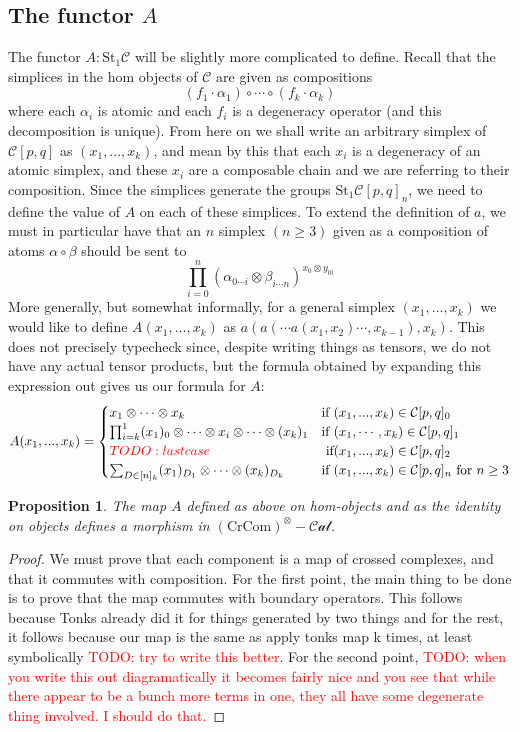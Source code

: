 \documentclass[12pt]{article}
\newtheorem{proposition}[theorem]{Proposition}
\theoremstyle{definition}
\newcommand{\TODO}[1]{\textcolor{red}{TODO: {#1}}}
\newcommand{\C}{\mathcal{C}}
\newcommand{\crcom}{\text{CrCom}}
\newcommand{\tensorcrossedcat}{(\crcom)^\otimes-\mathcal{Cat}}
\begin{document}
\subsection{The functor $A$}  
	The functor $A: \text{St}_1 \C$ will be slightly more complicated to define. Recall that the simplices in the hom objects of $\C$ are given as compositions 
	$$ (f_1 \cdot \alpha_1)\circ \cdots \circ (f_k \cdot \alpha_k )$$
	where each $\alpha_i$ is atomic and each $f_i$ is a degeneracy operator (and this decomposition is unique). 
	From here on we shall write an arbitrary simplex of $\C[p,q]$ as $(x_1,...,x_k)$, and mean by this that each $x_i$ is a degeneracy of an atomic simplex, and these $x_i$ are a composable chain and we are referring to their composition. Since the simplices generate the groups $\text{St}_1\C[p,q]_n$, we need to define the value of $A$ on each of these simplices. To extend the definition of $a$, we must in particular have that an $n$ simplex $(n \ge 3)$ given as a composition of atoms $\alpha \circ \beta$ should be sent to
	$$\prod_{i=0}^n \left( \alpha_{0\cdots i} \otimes \beta_{i \cdots  n}\right)^{x_0 \otimes y_{0i}}$$
More generally, but somewhat informally, for a general simplex $(x_1,...,x_k)$ we would like to define $A(x_1,...,x_k)$ as $a(a(\cdots a(x_1,x_2) \cdots, x_{k-1} ), x_k)$. This does not precisely typecheck since, despite writing things as tensors, we do not have any actual tensor products, but the formula obtained by expanding this expression out gives us our formula for $A$:
$$
A(x_1,...,x_k) = 
\begin{cases}
x_1 \otimes \cdots \otimes x_k & \text{if } (x_1,...,x_k) \in \C[p,q]_0 \\
\prod_{i = k}^1 (x_1)_0 \otimes \cdots \otimes x_i \otimes \cdots \otimes (x_k)_1 & \text{if } (x_1,\cdots,x_k) \in \C[p,q]_1 \\
\TODO{last case} & \text{ if} (x_1,...,x_k) \in \C[p,q]_2 \\
\sum_{D \in [n]_k} (x_1)_{D_1} \otimes \cdots \otimes (x_k)_{D_k} & \text{if } (x_1,...,x_k) \in \C[p,q]_n \text{ for } n \ge 3
\end{cases}
$$
\begin{proposition} 
	The map $A$ defined as above on hom-objects and as the identity on objects defines a morphism in $\tensorcrossedcat$.
\end{proposition}
\begin{proof}
	We must prove that each component is a map of crossed complexes, and that it commutes with composition. For the first point, the main thing to be done is to prove that the map commutes with boundary operators. This follows because Tonks already did it for things generated by two things and for the rest, it follows because our map is the same as apply tonks map k times, at least symbolically \TODO{try to write this better}. For the second point, \TODO{when you write this out diagramatically it becomes fairly nice and you see that while there appear to be a bunch more terms in one, they all have some degenerate thing involved. I should do that.}
\end{proof}
\end{document}
